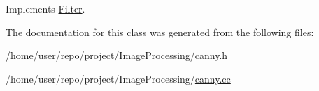 Implements \hyperlink{classFilter_afab0d50af44a19a370ebe46c69b8ff4e}{Filter}.



The documentation for this class was generated from the following files\+:\begin{DoxyCompactItemize}
\item 
/home/user/repo/project/\+Image\+Processing/\hyperlink{canny_8h}{canny.\+h}\item 
/home/user/repo/project/\+Image\+Processing/\hyperlink{canny_8cc}{canny.\+cc}\end{DoxyCompactItemize}
